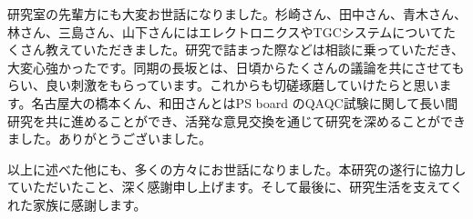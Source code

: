 研究室の先輩方にも大変お世話になりました。杉崎さん、田中さん、青木さん、林さん、三島さん、山下さんにはエレクトロニクスやTGCシステムについてたくさん教えていただきました。研究で詰まった際などは相談に乗っていただき、大変心強かったです。同期の長坂とは、日頃からたくさんの議論を共にさせてもらい、良い刺激をもらっています。これからも切磋琢磨していけたらと思います。名古屋大の橋本くん、和田さんとはPS board のQAQC試験に関して長い間研究を共に進めることができ、活発な意見交換を通じて研究を深めることができました。ありがとうございました。

以上に述べた他にも、多くの方々にお世話になりました。本研究の遂行に協力していただいたこと、深く感謝申し上げます。そして最後に、研究生活を支えてくれた家族に感謝します。


